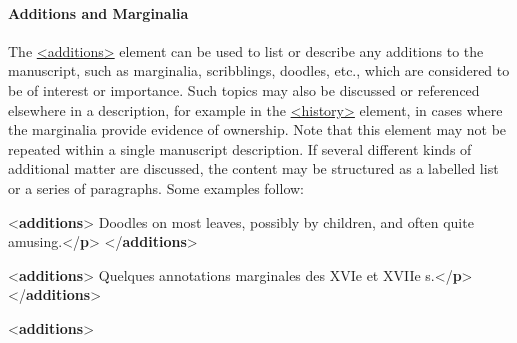 \paragraph[{Additions and Marginalia}]{Additions and Marginalia}\label{mspham}\par
The \hyperref[TEI.additions]{<additions>} element can be used to list or describe any additions to the manuscript, such as marginalia, scribblings, doodles, etc., which are considered to be of interest or importance. Such topics may also be discussed or referenced elsewhere in a description, for example in the \hyperref[TEI.history]{<history>} element, in cases where the marginalia provide evidence of ownership. Note that this element may not be repeated within a single manuscript description. If several different kinds of additional matter are discussed, the content may be structured as a labelled list or a series of paragraphs. Some examples follow: \par\bgroup{}\exampleFont \begin{shaded}\noindent\mbox{}{<\textbf{additions}>}\mbox{}\newline 
{}Doodles on most leaves, possibly by children, and often quite\mbox{}\newline 
\hspace*{1em}\hspace*{1em} amusing.{</\textbf{p}>}\mbox{}\newline 
{</\textbf{additions}>}\end{shaded}\egroup\par \noindent  \par\bgroup{}\exampleFont \begin{shaded}\noindent\mbox{}{<\textbf{additions}>}\mbox{}\newline 
{}Quelques annotations marginales des XVIe et XVIIe s.{</\textbf{p}>}\mbox{}\newline 
{</\textbf{additions}>}\end{shaded}\egroup\par \noindent  \par\bgroup{}\exampleFont \begin{shaded}\noindent\mbox{}{<\textbf{additions}>}\mbox{}\newline 

\end{shaded}
